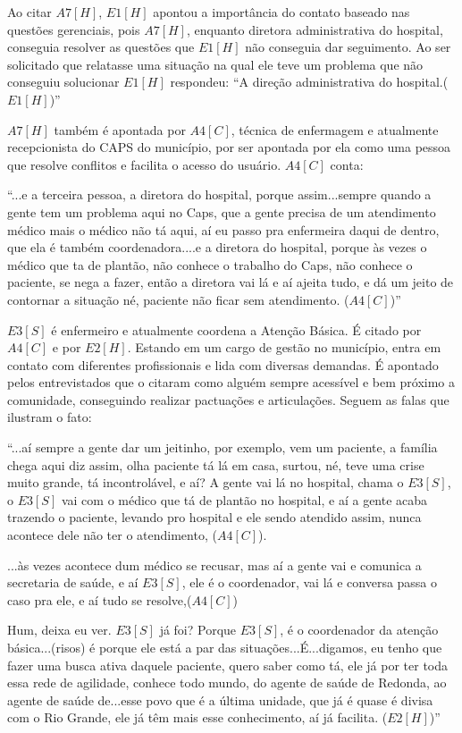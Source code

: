 Ao citar $A7[H]$, $E1[H]$ apontou a importância do contato baseado nas questões gerenciais, pois $A7[H]$, enquanto diretora administrativa do hospital, conseguia resolver as questões que $E1[H]$ não conseguia dar seguimento. Ao ser solicitado que relatasse uma situação na qual ele teve um problema que não conseguiu solucionar $E1[H]$ respondeu: ``A direção administrativa do hospital.($E1[H]$)''

$A7[H]$ também é apontada por $A4[C]$, técnica de enfermagem e atualmente recepcionista do CAPS do município, por ser apontada por ela como uma pessoa que resolve conflitos e facilita o acesso do usuário. $A4[C]$ conta: 

\begin{citacao}
``...e a terceira pessoa, a diretora do hospital, porque assim...sempre quando a gente tem um problema aqui no Caps, que a gente precisa de um atendimento médico mais o médico não tá aqui, aí eu passo pra enfermeira daqui de dentro, que ela é também coordenadora....e a diretora do hospital, porque às vezes o médico que ta de plantão, não conhece o trabalho do Caps, não conhece o paciente, se nega a fazer, então a diretora vai lá e aí ajeita tudo, e dá um jeito de contornar a situação né, paciente não ficar sem atendimento. ($A4[C]$)''
\end{citacao}


$E3[S]$ é enfermeiro e atualmente coordena a Atenção Básica. É citado por $A4[C]$ e por $E2[H]$. Estando em um cargo de gestão no município, entra em contato com diferentes profissionais e lida com diversas demandas. É apontado pelos entrevistados que o citaram como alguém sempre acessível e bem próximo a comunidade, conseguindo realizar pactuações e articulações. Seguem as falas que ilustram o fato:

\begin{citacao}
 ``...aí sempre a gente dar um jeitinho, por exemplo, vem um paciente, a família chega aqui diz assim, olha paciente tá lá em casa, surtou, né, teve uma crise muito grande, tá incontrolável, e aí? A gente vai lá no hospital, chama o $E3[S]$, o $E3[S]$ vai com o médico que tá de plantão no hospital, e aí a gente acaba trazendo o paciente, levando pro hospital e ele sendo atendido assim, nunca acontece dele não ter o atendimento, ($A4[C]$).
 
...às vezes acontece dum médico se recusar, mas aí a gente vai e comunica a secretaria de saúde, e aí $E3[S]$, ele é o coordenador, vai lá e conversa passa o caso pra ele, e aí tudo se resolve,($A4[C]$)

Hum, deixa eu ver. $E3[S]$ já foi? Porque $E3[S]$, é o coordenador da atenção básica...(risos) é porque ele está a par das situações...É...digamos, eu tenho que fazer uma busca ativa daquele paciente, quero saber como tá, ele já por ter toda essa rede de agilidade, conhece todo mundo, do agente de saúde de Redonda, ao agente de saúde de...esse povo que é a última unidade, que já é quase é  divisa com o Rio Grande, ele já têm mais esse conhecimento, aí já facilita. ($E2[H]$)''
\end{citacao}

